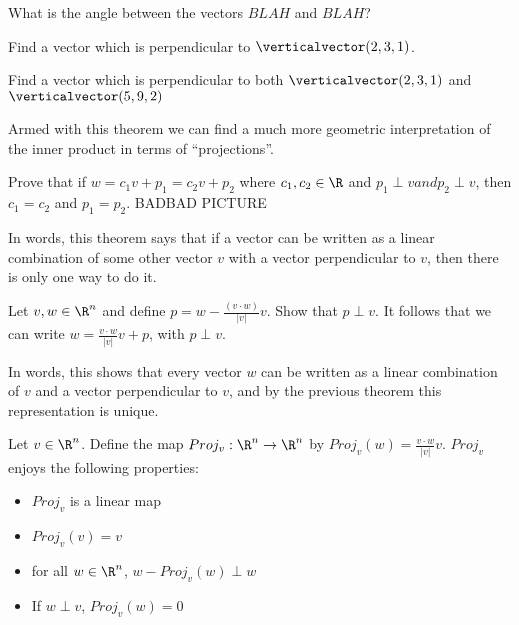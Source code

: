  \begin{question}
 	What is the angle between the vectors $BLAH$  and $BLAH$?
 \end{question}
	 	
 	\begin{question}
 		Find a vector which is perpendicular to $\verticalvector(2,3,1)$.  
 	\end{question}
 	
 	\begin{question}
 		Find a vector which is perpendicular to both $\verticalvector(2,3,1)$ and $\verticalvector(5,9,2)$
 	\begin{question}
 	
 	Armed with this theorem we can find a much more geometric interpretation of the inner product in terms of ``projections''.
 	
 	
 \begin{question}
 	Prove that if $w= c_1v + p_1 = c_2v+p_2$ where $c_1,c_2 \in \R$ and $p_1\perp v and p_2\perp v$, then $c_1 = c_2$ and $p_1 = p_2$.
 	BADBAD PICTURE
 \end{question}
 
 	In words, this theorem says that if a vector can be written as a linear combination of some other vector $v$ with a vector perpendicular to $v$, then 
 	there is only one way to do it.   
 
 \begin{question}
 	Let $v,w \in \R^n$ and define $p = w - \frac{(v \cdot w)}{|v|}v$.  Show that $p \perp v$.  It follows that we can write $w = \frac{v \cdot w}{|v|} v + p$, with $p\perp v$.
 \end{question}
 
	 In words, this shows that every vector $w$ can be written as a linear combination of $v$ and a vector perpendicular to $v$, and by the previous theorem this representation is
	 unique.
 
 \begin{definition}
 	Let $v \in \R^n$.  Define the map $Proj_v:\R^n \to \R^n$ by $Proj_v(w) = \frac{v \cdot w}{|v|} v$.    $Proj_v$ enjoys the following properties:
 		\begin{itemize}
 			\item $Proj_v$ is a linear map
 			\item $Proj_v(v) = v$
 			\item for all $w \in \R^n$,  $w - Proj_v(w) \perp w$
 			\item If $w \perp v$, $Proj_v(w) = 0$
 		\end{itemize}
 \end{definition}
 	

\end{question}
\end{question}

